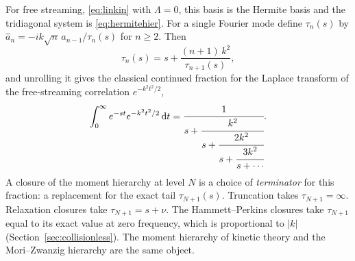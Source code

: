 For free streaming, \eqref{eq:linkin} with $\Lambda=0$, this basis is the
Hermite basis and the tridiagonal system is \eqref{eq:hermitehier}. For a
single Fourier mode define $\tau_n(s)$ by
$\hat a_{n}=-ik\sqrt n\,\hat a_{n-1}/\tau_n(s)$ for $n\ge2$. Then
\begin{equation}
  \tau_n(s)=s+\frac{(n+1)\,k^2}{\tau_{n+1}(s)},
  \label{eq:cf}
\end{equation}
and unrolling it gives the classical continued fraction for the Laplace
transform of the free-streaming correlation $e^{-k^2t^2/2}$,
\[
  \int_0^\infty e^{-st}e^{-k^2t^2/2}\,\mathrm{d} t
  =\cfrac{1}{s+\cfrac{k^2}{s+\cfrac{2k^2}{s+\cfrac{3k^2}{s+\cdots}}}} .
\]
A closure of the moment hierarchy at level $N$ is a choice of
\emph{terminator} for this fraction: a replacement for the exact tail
$\tau_{N+1}(s)$. Truncation takes $\tau_{N+1}=\infty$. Relaxation closures
take $\tau_{N+1}=s+\nu$. The Hammett--Perkins closures take
$\tau_{N+1}$ equal to its exact value at zero frequency, which is
proportional to $|k|$ (Section~\ref{sec:collisionless}). The moment
hierarchy of kinetic theory and the Mori--Zwanzig hierarchy are the same
object.
